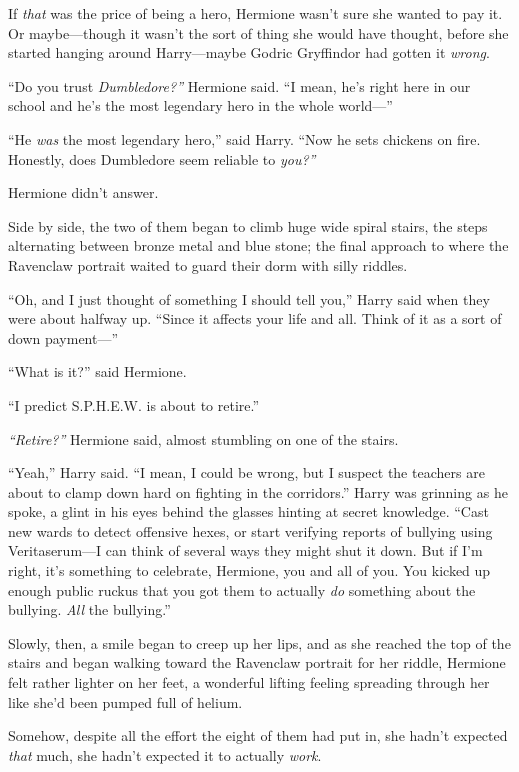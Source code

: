 If \emph{that} was the price of being a hero, Hermione wasn't sure she
wanted to pay it. Or maybe---though it wasn't the sort of thing she
would have thought, before she started hanging around Harry---maybe
Godric Gryffindor had gotten it \emph{wrong}.

``Do you trust \emph{Dumbledore?''} Hermione said. ``I mean, he's right
here in our school and he's the most legendary hero in the whole
world---''

``He \emph{was} the most legendary hero,'' said Harry. ``Now he sets
chickens on fire. Honestly, does Dumbledore seem reliable to
\emph{you?''}

Hermione didn't answer.

Side by side, the two of them began to climb huge wide spiral stairs,
the steps alternating between bronze metal and blue stone; the final
approach to where the Ravenclaw portrait waited to guard their dorm with
silly riddles.

``Oh, and I just thought of something I should tell you,'' Harry said
when they were about halfway up. ``Since it affects your life and all.
Think of it as a sort of down payment---''

``What is it?'' said Hermione.

``I predict S.P.H.E.W. is about to retire.''

\emph{``Retire?''} Hermione said, almost stumbling on one of the stairs.

``Yeah,'' Harry said. ``I mean, I could be wrong, but I suspect the
teachers are about to clamp down hard on fighting in the corridors.''
Harry was grinning as he spoke, a glint in his eyes behind the glasses
hinting at secret knowledge. ``Cast new wards to detect offensive hexes,
or start verifying reports of bullying using Veritaserum---I can think
of several ways they might shut it down. But if I'm right, it's
something to celebrate, Hermione, you and all of you. You kicked up
enough public ruckus that you got them to actually \emph{do} something
about the bullying. \emph{All} the bullying.''

Slowly, then, a smile began to creep up her lips, and as she reached the
top of the stairs and began walking toward the Ravenclaw portrait for
her riddle, Hermione felt rather lighter on her feet, a wonderful
lifting feeling spreading through her like she'd been pumped full of
helium.

Somehow, despite all the effort the eight of them had put in, she hadn't
expected \emph{that} much, she hadn't expected it to actually
\emph{work}.

